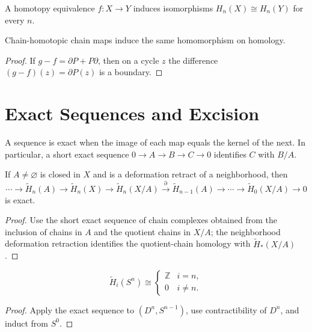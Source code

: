 \begin{corollary}
\label{cor:homotopy-equivalence-induces-homology-isomorphism}
A homotopy equivalence $f:X\to Y$ induces isomorphisms $H_n(X)\cong H_n(Y)$ for every $n$.
\end{corollary}

\begin{proposition}
\label{prop:chain-homotopic-maps-induce-same-homology-map}
Chain-homotopic chain maps induce the same homomorphism on homology.
\end{proposition}
\begin{proof}
\sketch If $g-f=\partial P+P\partial$, then on a cycle $z$ the difference $(g-f)(z)=\partial P(z)$ is a boundary.
\end{proof}

\section*{Exact Sequences and Excision}

A sequence is exact when the image of each map equals the kernel of the next.  In particular, a short exact sequence $0\to A\to B\to C\to0$ identifies $C$ with $B/A$.

\begin{theorem}
\label{thm:excision}
If $A\ne\varnothing$ is closed in $X$ and is a deformation retract of a neighborhood, then
\[
\cdots\to\widetilde H_n(A)\to\widetilde H_n(X)\to\widetilde H_n(X/A)\xrightarrow{\partial}\widetilde H_{n-1}(A)\to\cdots\to\widetilde H_0(X/A)\to0
\]
is exact.
\end{theorem}
\begin{proof}
\sketch Use the short exact sequence of chain complexes obtained from the inclusion of chains in $A$ and the quotient chains in $X/A$; the neighborhood deformation retraction identifies the quotient-chain homology with $\widetilde H_*(X/A)$.
\end{proof}

\begin{corollary}
\label{cor:homology-spheres}
\[
\widetilde H_i(S^n)\cong\begin{cases}\mathbb{Z}&i=n,\\0&i\ne n.\end{cases}
\]
\end{corollary}
\begin{proof}
\sketch Apply the exact sequence to $(D^n,S^{n-1})$, use contractibility of $D^n$, and induct from $S^0$.
\end{proof}


